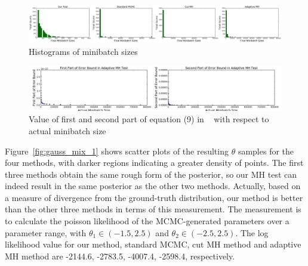 \documentclass{article}
\begin{document}
\begin{figure}[t]
    \centering
   \includegraphics[width=1\linewidth]{minibatch_size_gaussian.png}
    \caption{
    Histograms of minibatch sizes %
    }
    \label{fig:gauss_mix_2}
\end{figure}

\begin{figure}[t]
	\centering
	\includegraphics[width=\linewidth]{GaussianMixtureResult/first_second_part_gaussian.png}
	\caption{Value of first and second part of equation (9) in ~\cite{icml2014c1_bardenet14} with respect to actual minibatch size}
	\label{fig:gauss_bardenet}
\end{figure}


Figure~\ref{fig:gauss_mix_1} shows scatter plots of the resulting $\theta$ samples for the four
methods, with darker regions indicating a greater density of points. The first three methods obtain the
same rough form of the posterior, so our MH test can indeed result in the same posterior as the
other two methods. %
Actually, based on a measure of divergence from the ground-truth distribution, our method is better than the other three methods in terms of this measurement. The measurement is to calculate the poisson likelihood of the MCMC-generated parameters over a parameter range, with $\theta_1 \in (-1.5, 2.5)$ and $\theta_2 \in (-2.5, 2.5)$. The log likelihood value for our method, standard MCMC, cut MH method and adaptive MH method are -2144.6, -2783.5, -4007.4, -2598.4, respectively. 
\end{document}
